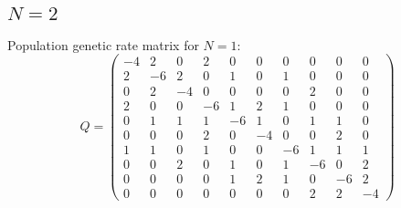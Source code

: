 \documentclass{article}
\theoremstyle{plain}
\theoremstyle{definition}
\begin{document}
\subsection{$N = 2$}

Population genetic rate matrix for $N = 1$:
\begin{equation}
	Q =
	\begin{pmatrix}
		-4 & 2 & 0 & 2 & 0 & 0 & 0 & 0 & 0 & 0 \\
		2 & -6 & 2 & 0 & 1 & 0 & 1 & 0 & 0 & 0 \\
		0 & 2 & -4 & 0 & 0 & 0 & 0 & 2 & 0 & 0 \\
		2 & 0 & 0 & -6 & 1 & 2 & 1 & 0 & 0 & 0 \\
		0 & 1 & 1 & 1 & -6 & 1 & 0 & 1 & 1 & 0 \\
		0 & 0 & 0 & 2 & 0 & -4 & 0 & 0 & 2 & 0 \\
		1 & 1 & 0 & 1 & 0 & 0 & -6 & 1 & 1 & 1 \\
		0 & 0 & 2 & 0 & 1 & 0 & 1 & -6 & 0 & 2 \\
		0 & 0 & 0 & 0 & 1 & 2 & 1 & 0 & -6 & 2 \\
		0 & 0 & 0 & 0 & 0 & 0 & 0 & 2 & 2 & -4
	\end{pmatrix}
\end{equation}
\end{document}
